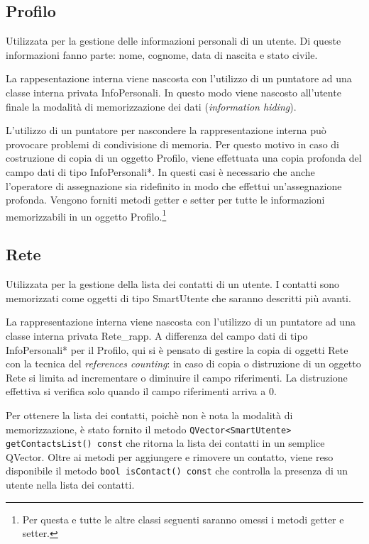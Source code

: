 \documentclass[a4paper]{article}
\begin{document}
\subsection*{Profilo}
Utilizzata per la gestione delle informazioni personali di un utente. Di queste informazioni fanno parte: nome, cognome, data di nascita e stato civile. 

La rappesentazione interna viene nascosta con l'utilizzo di un puntatore ad una classe interna privata InfoPersonali. In questo modo viene nascosto all'utente finale la modalità di memorizzazione dei dati (\textit{information hiding}).

L'utilizzo di un puntatore per nascondere la rappresentazione interna può provocare problemi di condivisione di memoria. Per questo motivo in caso di costruzione di copia di un oggetto Profilo, viene effettuata una copia profonda del campo dati di tipo InfoPersonali*. In questi casi è necessario che anche l'operatore di assegnazione sia ridefinito in modo che effettui un'assegnazione profonda. Vengono forniti metodi getter e setter per tutte le informazioni memorizzabili in un oggetto Profilo.\footnote{Per questa e tutte le altre classi seguenti saranno omessi i metodi getter e setter.}

\subsection*{Rete}
Utilizzata per la gestione della lista dei contatti di un utente. I contatti sono memorizzati come oggetti di tipo SmartUtente che saranno descritti più avanti.

La rappresentazione interna viene nascosta con l'utilizzo di un puntatore ad una classe interna privata Rete\_rapp. A differenza del campo dati di tipo InfoPersonali* per il Profilo, qui si è pensato di gestire la copia di oggetti Rete con la tecnica del \textit{references counting}: in caso di copia o distruzione di un oggetto Rete si limita ad incrementare o diminuire il campo riferimenti. La distruzione effettiva si verifica solo quando il campo riferimenti arriva a 0.

Per ottenere la lista dei contatti, poichè non è nota la modalità di memorizzazione, è stato fornito il metodo \texttt{QVector<SmartUtente> getContactsList() const} che ritorna la lista dei contatti in un semplice QVector. Oltre ai metodi per aggiungere e rimovere un contatto, viene reso disponibile il metodo \texttt{bool isContact() const} che controlla la presenza di un utente nella lista dei contatti.
\end{document}
